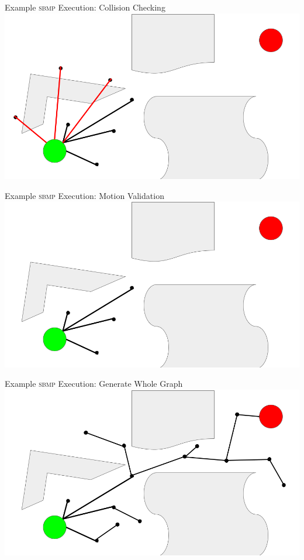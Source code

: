 \documentclass{beamer}
\begin{document}
\begin{frame}{Example \textsc{sbmp} Execution: Collision Checking}
\includegraphics[width=\textwidth]{./assets/rrt_slides/rrt_slides_5.png}
\end{frame}

\begin{frame}{Example \textsc{sbmp} Execution: Motion Validation}
\includegraphics[width=\textwidth]{./assets/rrt_slides/rrt_slides_6.png}
\end{frame}

\begin{frame}{Example \textsc{sbmp} Execution: Generate Whole Graph}
\includegraphics[width=\textwidth]{./assets/rrt_slides/rrt_slides_7.png}
\end{frame}
\end{document}
